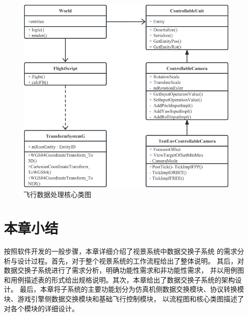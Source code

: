 \begin{figure}[h!]
    \begin{center}
        \includegraphics[width=\textwidth]{pictures/classdiagram4.pdf}
        \caption{飞行数据处理核心类图}
        \label{module42}
    \end{center}
\end{figure}
\section{本章小结}
按照软件开发的一般步骤，本章详细介绍了视景系统中数据交换子系统
的需求分析与设计过程。首先，对于整个视景系统的工作流程给出了整体说明。
其后，对数据交换子系统进行了需求分析，明确功能性需求和非功能性需求，
并以用例图和用例描述表的形式给出规格说明。其次，本章给出了数据交换子系统的架构设计。
最后，本章将子系统的主要功能划分为仿真机侧数据交换模块、协议转换模块、游戏引擎侧数据交换模块和基础飞行控制模块，
以流程图和核心类图描述了对各个模块的详细设计。